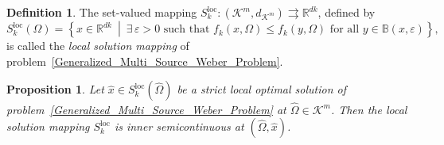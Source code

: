 \documentclass[sn-mathphys-num]{sn-jnl}%
\def\Hat{\widehat}
\newtheorem{proposition}[theorem]{Proposition}
\theoremstyle{definition}
\newtheorem{definition}[theorem]{Definition}
\begin{document}
\begin{definition}
	\label{L.S.Mapping_1}
	The set-valued mapping $S_k^{\mathrm{loc}}:(\mathcal{K}^m,d_{\mathcal{K}^m})
	\rightrightarrows \mathbb{R}^{dk}$, defined by
	\begin{equation}
		\label{S_kloc_definition}
		S_k^{\mathrm{loc}}(\Omega)=
		\left\{
		x\in\mathbb{R}^{dk}\ \middle|\ 
		\exists\,\varepsilon>0 \text{ such that }
		f_k(x,\Omega)\leq f_k(y,\Omega)
		\text{ for all } y\in \mathbb{B}(x,\varepsilon)
		\right\},
	\end{equation}
	is called the \textit{local solution mapping} of problem~\eqref{Generalized_Multi_Source_Weber_Problem}. 
\end{definition}

\begin{proposition}
	\label{L.S.Mapping_2}
	Let $\Hat x\in S_{k}^\mathrm{loc}(\Hat{\Omega})$ be a strict local optimal solution of problem~\eqref{Generalized_Multi_Source_Weber_Problem} at $\Hat{\Omega}\in\mathcal{K}^m$. Then the local solution mapping $S_{k}^\mathrm{loc}$ is inner semicontinuous at $(\Hat{\Omega},\Hat{x})$.
\end{proposition}
\end{document}
